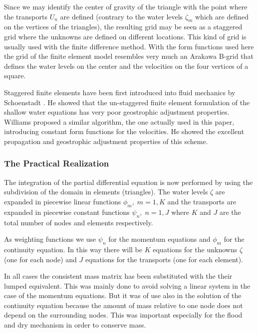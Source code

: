 Since we may
identify the center of gravity of the triangle with the point where
the transports $U_{n}$ are defined (contrary to the water levels
$\zeta_{m}$ which are defined on the vertices of the triangles), the
resulting grid may be seen as a staggered grid where the unknowns
are defined on different locations. This kind of grid is usually used
with the finite difference method. With the form functions used here
the grid of the finite element model resembles
very much an Arakawa B-grid that defines the water levels on the center
and the velocities on the four vertices of a square.

Staggered finite elements have been first introduced into
fluid mechanics by Schoenstadt \cite{Schoenstadt80}. 
He showed that the un-staggered
finite element formulation of the shallow water equations has very
poor geostrophic adjustment properties. Williams 
\cite{Williams81a, Williams81b}
proposed a similar algorithm, the one
actually used in this paper, introducing constant form functions for the
velocities. He showed the excellent propagation and geostrophic
adjustment properties of this scheme.


\subsubsection{The Practical Realization}

The integration of the partial differential equation is now performed by
using the subdivision of the domain in elements (triangles). The
water levels $\zeta$ are expanded in piecewise linear functions
$\phi_{m}, \; m=1,K$ and
the transports are expanded in piecewise constant functions
$\psi_{n}, \; n=1,J$ where $K$ and $J$ are the total number of nodes
and elements respectively.

As weighting functions we use $\psi_{n}$ for the momentum equations
and $\phi_{m}$ for the continuity equation. In this way there will
be $K$ equations for the unknowns $\zeta$ (one for each node) and
$J$ equations for the transports (one for each element).

In all cases the consistent mass matrix has been substituted with
the their lumped equivalent. This was mainly done
to avoid solving a linear system in the case of the momentum equations.
But it was of use also in the solution of the continuity equation
because the amount of mass relative to 
one node does not depend on the surrounding
nodes. This was important especially for the flood and dry mechanism
in order to conserve mass.


